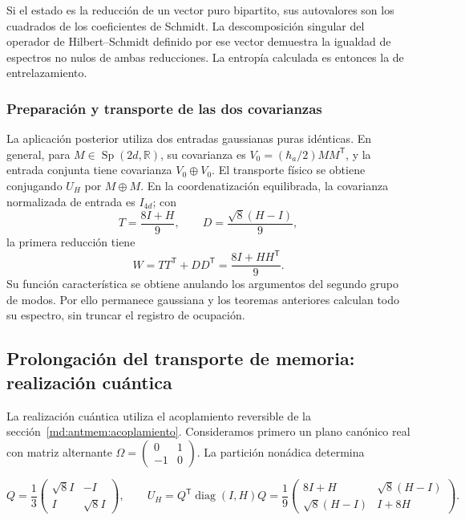 Si el estado es la reducción de un vector puro bipartito, sus
autovalores son los cuadrados de los coeficientes de Schmidt.
La descomposición singular del operador de Hilbert--Schmidt definido
por ese vector demuestra la igualdad de espectros no nulos de ambas
reducciones. La entropía calculada es entonces la de entrelazamiento.

\subsubsection{Preparación y transporte de las dos covarianzas}
La aplicación posterior utiliza dos entradas gaussianas puras idénticas.
En general, para \(M\in\operatorname{Sp}(2d,\mathbb R)\), su covarianza es
\(V_0=(\hbar_a/2)MM^{\mathsf T}\), y la entrada conjunta tiene
covarianza \(V_0\oplus V_0\). El transporte físico se obtiene
conjugando \(U_H\) por \(M\oplus M\). En la coordenatización equilibrada,
la covarianza normalizada de entrada es \(I_{4d}\); con
\[
 T=\frac{8I+H}{9},\qquad D=\frac{\sqrt8(H-I)}9,
\]
la primera reducción tiene
\[
 W=TT^{\mathsf T}+DD^{\mathsf T}=\frac{8I+HH^{\mathsf T}}9.
\]
Su función característica se obtiene anulando los argumentos del
segundo grupo de modos. Por ello permanece gaussiana y los teoremas
anteriores calculan todo su espectro, sin truncar el registro de ocupación.

\subsection{Prolongación del transporte de memoria: realización cuántica}

La realización cuántica utiliza el acoplamiento reversible de la sección~\ref{md:antmem:acoplamiento}. Consideramos primero un plano canónico real con matriz alternante \(\Omega=\left(\begin{smallmatrix}0&1\\-1&0\end{smallmatrix}\right)\). La partición nonádica determina

\begin{equation}
Q=\frac13\begin{pmatrix}\sqrt8 I&-I\\I&\sqrt8 I\end{pmatrix},\qquad
U_H=Q^{\mathsf T}\operatorname{diag}(I,H)Q
=\frac19\begin{pmatrix}8I+H&\sqrt8(H-I)\\
\sqrt8(H-I)&I+8H\end{pmatrix}.
\label{md:antmem:cuantica:eq:5.1}
\end{equation}


